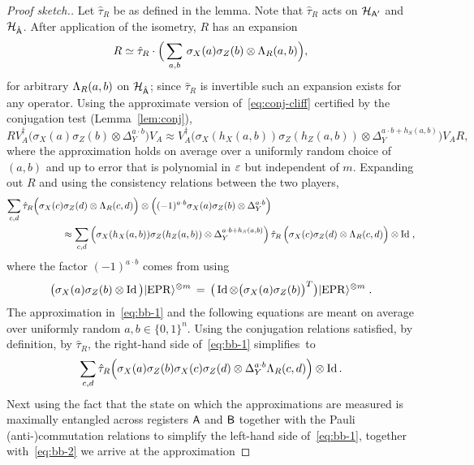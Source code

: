 \begin{proof}[Proof sketch.]
Let $\hat{\tau}_R$ be as defined in the lemma. Note that $\hat{\tau}_R$ acts on $\mathcal{H}_{{\textsf{A}}'}$ and $\mathcal{H}_{\hat{{\textsf{A}}}}$. After application of the isometry, $R$ has an expansion
\begin{equation}\label{eq:r-1}
R \simeq \hat{\tau}_R \cdot \Big(\sum_{a,b} \,\sigma_X(a)\sigma_Z(b) \otimes \Lambda_R(a,b)\Big),
\end{equation}
 for arbitrary $\Lambda_R(a,b)$ on $\mathcal{H}_{\hat{{\textsf{A}}}}$; since $\hat{\tau}_R $ is invertible such an expansion exists for any operator. 
Using the approximate version of~\eqref{eq:conj-cliff} certified by the conjugation test (Lemma~\ref{lem:conj}), 
$$ R V_A^\dagger \big(\sigma_X(a)\sigma_Z(b)\otimes \Delta_Y^{a\cdot b}\big) V_A \approx V_A^\dagger \big(\sigma_X(h_X(a,b))\sigma_Z(h_Z(a,b)) \otimes \Delta_Y^{a\cdot b + h_S(a,b)}\big)V_A R,$$
where the approximation holds on average over a uniformly random choice of $(a,b)$ and up to error that is polynomial in $\varepsilon$ but independent of $m$. 
Expanding out $R$ and using the consistency relations between the two players, 
\begin{align}
\sum_{c,d} \hat{\tau}_R \Big(\sigma_X(c)\sigma_Z(d) &\otimes \phase_R(c,d)\Big) \otimes \Big((-1)^{a\cdot b}\sigma_X(a)\sigma_Z(b)\otimes \Delta_Y^{a\cdot b}\Big)\notag\\
& \!\!\!\!\!\!\!\!\!\!\!\!\!\!\!\!\approx \sum_{c,d} \Big(\sigma_X(h_X(a,b))\sigma_Z(h_Z(a,b)) \otimes \Delta_Y^{a\cdot b + h_S(a,b)}\Big) \,\hat{\tau}_R \, \Big(\sigma_X(c)\sigma_Z(d) \otimes \phase_R(c,d)\Big) \otimes \Id\;,\label{eq:bb-1}
\end{align}
where the factor $(-1)^{a\cdot b}$ comes from using 
$$\big(\sigma_X(a)\sigma_Z(b)\otimes \mathop{\rm Id}\nolimits\big) |{\rm EPR}\rangle^{\otimes m} \,=\, \big(\mathop{\rm Id}\nolimits \otimes \big(\sigma_X(a)\sigma_Z(b)\big)^T \big)|{\rm EPR}\rangle^{\otimes m}\;.$$
The approximation in~\eqref{eq:bb-1} and the following equations are meant on average over uniformly random $a,b\in\{0,1\}^n$.
Using the conjugation relations satisfied, by definition, by $\hat{\tau}_R$,  the right-hand side of~\eqref{eq:bb-1} simplifies~to 
\begin{equation}\label{eq:bb-2}
\sum_{c,d} \hat{\tau}_R \Big(\sigma_X(a)\sigma_Z(b) \sigma_X(c)\sigma_Z(d) \otimes \Delta_Y^{a\cdot b }\Lambda_R(c,d)\Big)  \otimes \mathop{\rm Id}\nolimits.
\end{equation}
Next using the fact that the state on which the approximations are measured is maximally entangled across registers ${\textsf{A}}$ and ${\textsf{B}}$ together with the Pauli (anti-)commutation relations to simplify the left-hand side of~\eqref{eq:bb-1}, together with~\eqref{eq:bb-2} we arrive at the approximation

\end{proof}
